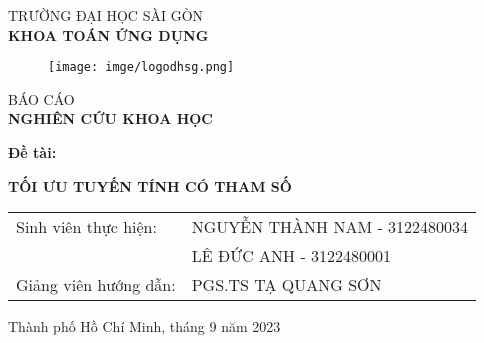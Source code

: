 \documentclass{article} %
\begin{document}
\begin{titlepage}
\begin{center}
\vspace{-15pt} TRƯỜNG ĐẠI HỌC SÀI GÒN\\
\textbf{\fontsize{16pt}{0pt}\selectfont KHOA TOÁN ỨNG DỤNG}
\vspace{0.5cm}
\begin{figure}[H]
    \centering
    \texttt{[image: imge/logodhsg.png]}
\end{figure}
\vspace{1.5cm}
\fontsize{24pt}{0pt}\selectfont BÁO CÁO\\
\vspace{12pt}
\textbf{\fontsize{32pt}{0pt}\selectfont NGHIÊN CỨU KHOA HỌC}
\vspace{1.5cm}
\end{center}
\hspace{20pt}\textbf{\fontsize{14pt}{0pt}\selectfont Đề tài:}
\begin{center}
\textbf{\fontsize{20pt}{0pt}\selectfont TỐI ƯU TUYẾN TÍNH CÓ THAM SỐ} 
\vspace{1cm}
\begin{table}[H]
    \centering
    \begin{tabular}{l l}
\fontsize{14pt}{0pt}\selectfont Sinh viên thực hiện:     & \fontsize{14pt}{0pt}\selectfont NGUYỄN THÀNH NAM - 3122480034 \vspace{6pt}\\     
   & \fontsize{14pt}{0pt}\selectfont LÊ ĐỨC ANH - 3122480001 \vspace{6pt}\\
\fontsize{14pt}{0pt}\selectfont Giảng viên hướng dẫn: & \fontsize{14pt}{0pt}\selectfont PGS.TS TẠ QUANG SƠN
\end{tabular}
\end{table}
\vspace{1.5cm}
\fontsize{14pt}{0pt}\selectfont Thành phố Hồ Chí Minh, tháng 9 năm 2023
\end{center}
\end{titlepage}
\cleardoublepage
\thispagestyle{empty}
\end{document}
